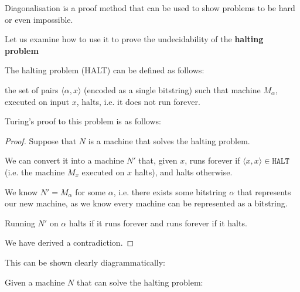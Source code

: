 \documentclass{article}
\begin{document}
      Diagonalisation is a proof method that can be used to show problems to be hard or even impossible.

      Let us examine how to use it to prove the undecidability of the \textbf{halting problem}

      The halting problem (HALT) can be defined as follows:


      \begin{problem}

        the set of pairs $\langle \alpha,x \rangle $ (encoded as a single bitstring) such that machine $M_{\alpha }$, executed on input $x$, halts, i.e. it does not run forever.

      \end{problem}


      Turing's proof to this problem is as follows:

      \begin{proof}
        Suppose that $N$ is a machine that solves the halting problem.

        We can convert it into a machine $N'$ that, given $x$, runs forever if $\langle x,x \rangle \in \texttt{HALT} $ (i.e. the machine $M_{x}$ executed on $x$ halts), and halts otherwise.

        We know $N' = M_{\alpha }$ for some $\alpha $, i.e. there exists some bitstring $\alpha $ that represents our new machine, as we know every machine can be represented as a bitstring.

        Running $N'$ on $\alpha$ halts if it runs forever and runs forever if it halts.

        We have derived a contradiction.


      \end{proof}

      This can be shown clearly diagrammatically:


      Given a machine $N$ that can solve the halting problem:


      \begin{center}
      \end{center}
\end{document}
